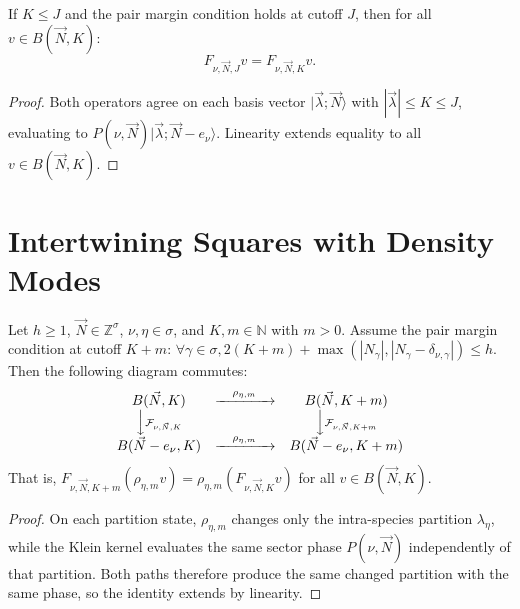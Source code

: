 \begin{lemma}
\label{lem:kernel_cutoff_consistent}
If $K \le J$ and the pair margin condition holds at cutoff $J$, then for all $v \in B(\vec{N}, K)$:
\begin{equation}
F_{\nu, \vec{N}, J} v = F_{\nu, \vec{N}, K} v.
\end{equation}
\end{lemma}

\begin{proof}
Both operators agree on each basis vector $|\vec{\lambda}; \vec{N}\rangle$ with $|\vec{\lambda}| \le K \le J$, evaluating to $P(\nu, \vec{N}) |\vec{\lambda}; \vec{N} - e_\nu\rangle$. Linearity extends equality to all $v \in B(\vec{N}, K)$.
\end{proof}

\section{Intertwining Squares with Density Modes}

\begin{theorem}
\label{thm:klein_raising_square}
Let $h \ge 1$, $\vec{N} \in \mathbb{Z}^\sigma$, $\nu, \eta \in \sigma$, and $K, m \in \mathbb{N}$ with $m > 0$. Assume the pair margin condition at cutoff $K + m$: $\forall \gamma \in \sigma, 2(K + m) + \max(|N_\gamma|, |N_\gamma - \delta_{\nu, \gamma}|) \le h$.
Then the following diagram commutes:
\begin{equation}
\label{eq:raising_diagram}
\begin{matrix}
B(\vec{N}, K) & \xrightarrow{\quad \rho_{\eta, m} \quad} & B(\vec{N}, K + m) \\
\Big\downarrow \scriptstyle{\mathcal{F}_{\nu, \vec{N}, K}} & & \Big\downarrow \scriptstyle{\mathcal{F}_{\nu, \vec{N}, K+m}} \\
B(\vec{N}-e_\nu, K) & \xrightarrow{\quad \rho_{\eta, m} \quad} & B(\vec{N}-e_\nu, K + m)
\end{matrix}
\end{equation}
That is, $F_{\nu, \vec{N}, K+m} (\rho_{\eta, m} v) = \rho_{\eta, m} (F_{\nu, \vec{N}, K} v)$ for all $v \in B(\vec{N}, K)$.
\end{theorem}

\begin{proof}
On each partition state, $\rho_{\eta,m}$ changes only the intra-species partition $\lambda_\eta$, while the Klein kernel evaluates the same sector phase $P(\nu,\vec{N})$ independently of that partition. Both paths therefore produce the same changed partition with the same phase, so the identity extends by linearity.
\end{proof}

